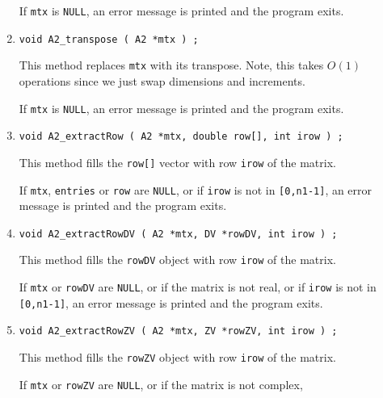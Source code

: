 \begin{enumerate}
\par {}
If {\tt mtx} is {\tt NULL}, 
an error message is printed and the program exits.
\item
\begin{verbatim}
void A2_transpose ( A2 *mtx ) ;
\end{verbatim}
This method replaces {\tt mtx} with its transpose.
Note, this takes $O(1)$ operations since we just swap dimensions and
increments.
\par {}
If {\tt mtx} is {\tt NULL}, 
an error message is printed and the program exits.
\item
\begin{verbatim}
void A2_extractRow ( A2 *mtx, double row[], int irow ) ;
\end{verbatim}
This method fills the {\tt row[]} vector with row {\tt irow} of the
matrix.
\par {}
If {\tt mtx}, {\tt entries} or {\tt row} are {\tt NULL},
or if {\tt irow} is not in {\tt [0,n1-1]},
an error message is printed and the program exits.
\item
\begin{verbatim}
void A2_extractRowDV ( A2 *mtx, DV *rowDV, int irow ) ;
\end{verbatim}
This method fills the {\tt rowDV} object with row {\tt irow} of the
matrix.
\par {}
If {\tt mtx} or {\tt rowDV} are {\tt NULL},
or if  the matrix is not real,
or if {\tt irow} is not in {\tt [0,n1-1]},
an error message is printed and the program exits.
\item
\begin{verbatim}
void A2_extractRowZV ( A2 *mtx, ZV *rowZV, int irow ) ;
\end{verbatim}
This method fills the {\tt rowZV} object with row {\tt irow} of the
matrix.
\par {}
If {\tt mtx} or {\tt rowZV} are {\tt NULL},
or if  the matrix is not complex,

\end{enumerate}
